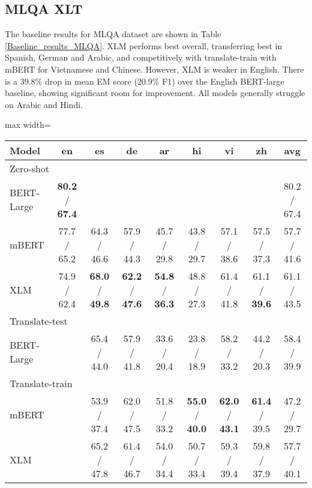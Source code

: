 \documentclass[11pt]{article}
\begin{document}
\subsection{MLQA XLT}

The baseline results for MLQA dataset are shown in Table \ref{Baseline_results_MLQA}. XLM performs best overall, transferring best in Spanish, German and Arabic, and competitively with translate-train with mBERT for Vietnamese and Chinese. However, XLM is weaker in English. There is a 39.8\% drop in mean EM score (20.9\% F1) over the English BERT-large baseline,
showing significant room for improvement. All models generally struggle on Arabic and Hindi.

\begin{table*}[!ht]
    \centering
    \begin{adjustbox}{max width=\textwidth}
    \begin{tabular}{l|ccccccc|c}
    \toprule
        Model & en & es & de & ar & hi & vi & zh & avg \\ \midrule
        \multicolumn{9}{l}{Zero-shot} \\ \midrule
        BERT-Large & \textbf{80.2} / \textbf{67.4} & ~ & ~ & ~ & ~ & ~ & ~ & 80.2 / 67.4 \\ 
        mBERT & 77.7 / 65.2 & 64.3 / 46.6 & 57.9 / 44.3 & 45.7 / 29.8 & 43.8 / 29.7 & 57.1 / 38.6 & 57.5 / 37.3 & 57.7 / 41.6 \\ 
        XLM & 74.9 / 62.4 & \textbf{68.0} / \textbf{49.8} & \textbf{62.2} / \textbf{47.6} & \textbf{54.8} / \textbf{36.3} & 48.8 / 27.3 & 61.4 / 41.8 & 61.1 / \textbf{39.6} & 61.1 / 43.5 \\ \midrule
        \multicolumn{9}{l}{Translate-test} \\ \midrule
        BERT-Large & ~ & 65.4 / 44.0 & 57.9 / 41.8 & 33.6 / 20.4 & 23.8 / 18.9 & 58.2 / 33.2 & 44.2 / 20.3 & 58.4 / 39.9 \\ \midrule
        \multicolumn{9}{l}{Translate-train} \\ \midrule
        mBERT & ~ & 53.9 / 37.4 & 62.0 / 47.5 & 51.8 / 33.2 & \textbf{55.0} / \textbf{40.0} & \textbf{62.0} / \textbf{43.1} & \textbf{61.4} / 39.5 & 47.2 / 29.7\\
        XLM & ~ & 65.2 / 47.8 & 61.4 / 46.7 & 54.0 / 34.4 & 50.7 / 33.4 & 59.3 / 39.4 & 59.8 / 37.9 & 57.7 / 40.1 \\ 
        \bottomrule
    \end{tabular}
    \end{adjustbox}
    \caption{Baseline results (F1/EM) for each language in MLQA dataset.}
    \label{Baseline_results_MLQA}
\end{table*}
\end{document}
